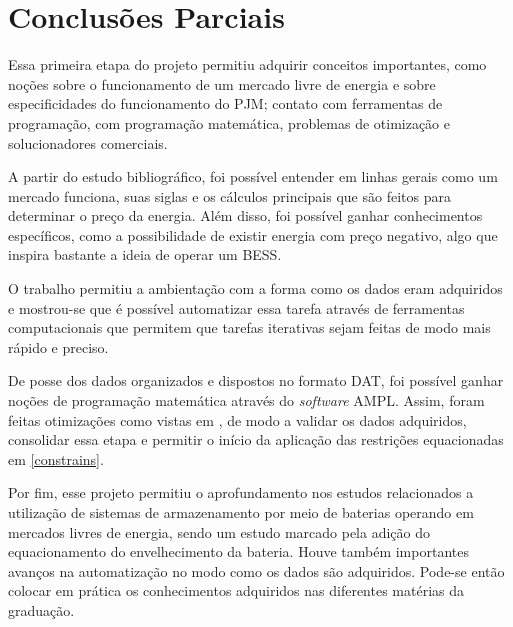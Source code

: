 \chapter[Conclusões Parciais]{Conclusões Parciais}
\label{Conclusao}

Essa primeira etapa do projeto permitiu adquirir conceitos importantes, como noções sobre o funcionamento de um mercado livre de energia e sobre especificidades do funcionamento do PJM; contato com ferramentas de programação, com programação matemática, problemas de otimização e solucionadores comerciais.

A partir do estudo bibliográfico, foi possível entender em linhas gerais como um mercado funciona, suas siglas e os cálculos principais que são feitos para determinar o preço da energia. Além disso, foi possível ganhar conhecimentos específicos, como a possibilidade de existir energia com preço negativo, algo que inspira bastante a ideia de operar um \ac{BESS}.

O trabalho permitiu a ambientação com a forma como os dados eram adquiridos e mostrou-se que é possível automatizar essa tarefa através de ferramentas computacionais que permitem que tarefas iterativas sejam feitas de modo mais rápido e preciso.

De posse dos dados organizados e dispostos no formato DAT, foi possível ganhar noções de programação matemática através do \textit{software} AMPL. Assim, foram feitas otimizações como vistas em \cite{salles2017}, de modo a validar os dados adquiridos, consolidar essa etapa e permitir o início da aplicação das restrições equacionadas em \ref{constrains}.


Por fim, esse projeto permitiu o aprofundamento nos estudos relacionados a utilização de sistemas de armazenamento por meio de baterias operando em mercados livres de energia, sendo um estudo marcado pela adição do equacionamento do envelhecimento da bateria. Houve também importantes avanços na automatização no modo como os dados são adquiridos. Pode-se então colocar em prática os conhecimentos adquiridos nas diferentes matérias da graduação.

